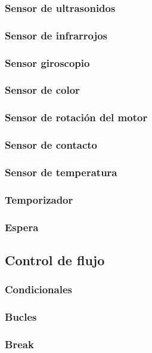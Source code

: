\documentclass[12pt,a4paper]{article}
\begin{document}
\subsubsection{Sensor de ultrasonidos}
\subsubsection{Sensor de infrarrojos}
\subsubsection{Sensor giroscopio}
\subsubsection{Sensor de color}
\subsubsection{Sensor de rotación del motor}
\subsubsection{Sensor de contacto}
\subsubsection{Sensor de temperatura}
\subsubsection{Temporizador}
\subsubsection{Espera}
\subsection{Control de flujo}
\subsubsection{Condicionales}
\subsubsection{Bucles}
\subsubsection{Break}
\end{document}
